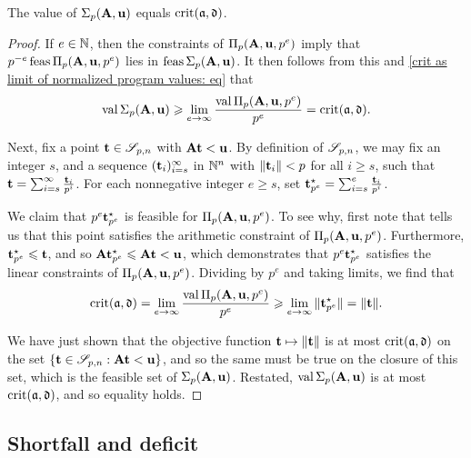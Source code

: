 \documentclass{article}
\begin{document}
\begin{proposition}
   \label{prop: value of fractal program is crit}
   The value of $\Sigma_p(\mathbf{A},\mathbf{u})$ equals $\operatorname{crit}(\mathfrak{a}, \mathfrak{d})$.
\end{proposition}

\begin{proof}
   If $e \in \mathbb{N}$, then the constraints of $\Pi_p(\mathbf{A}, \mathbf{u}, p^e)$ imply that $p^{-e}  \operatorname{feas} \Pi_p(\mathbf{A}, \mathbf{u}, p^e)$ lies in $\operatorname{feas} \Sigma_p(\mathbf{A},\mathbf{u})$.
   It then follows from this and \eqref{crit as limit of normalized program values: eq} that
   \[
      \operatorname{val}\Sigma_p(\mathbf{A},\mathbf{u}) \geqslant \displaystyle \lim_{e \to \infty}\frac{\operatorname{val}\Pi_p(\mathbf{A},\mathbf{u}, p^e)}{p^e} = \operatorname{crit}(\mathfrak{a}, \mathfrak{d}).
   \]

   Next, fix a point $\mathbf{t} \in \mathscr{S}_{p,n}$ with $\mathbf{A} \mathbf{t} < \mathbf{u}$.
   By definition of $\mathscr{S}_{p,n}$, we may fix an integer $s$, and a sequence $( \mathbf{t}_i )_{i=s}^\infty$ in $\mathbb{N}^n$ with $\| \mathbf{t}_i \| < p$ for all $i \geq s$, such that $\mathbf{t} = \sum_{i=s}^{\infty} \frac{\mathbf{t}_i}{p^i}$.
   For each nonnegative integer $e \geq s$, set $\mathbf{t}^\star_{p^e} = \sum_{i=s}^{e} \frac{\mathbf{t}_i}{p^i}$.

   We claim that $p^e  \mathbf{t}^\star_{p^e}$ is feasible for $\Pi_p(\mathbf{A}, \mathbf{u}, p^e)$.
   To see why, first note that  tells us that this point satisfies the arithmetic constraint of $\Pi_p(\mathbf{A}, \mathbf{u}, p^e)$.
   Furthermore, $\mathbf{t}^{\star}_{p^e} \leqslant \mathbf{t}$, and so $\mathbf{A} \mathbf{t}^{\star}_{p^e} \leqslant \mathbf{A} \mathbf{t} < \mathbf{u}$, which demonstrates that $p^e \mathbf{t}^\star_{p^e}$ satisfies the linear constraints of $\Pi_p(\mathbf{A}, \mathbf{u}, p^e)$.
   Dividing by $p^e$ and taking limits, we find that
   \[
      \operatorname{crit}(\mathfrak{a}, \mathfrak{d}) = \lim_{e \to \infty} \frac{\operatorname{val} \Pi_p(\mathbf{A}, \mathbf{u}, p^e)}{p^e} \geqslant \lim_{e \to \infty}   \| \mathbf{t}^\star_{p^e} \| = \| \mathbf{t} \|.
   \]

   We have just shown that the objective function $\mathbf{t} \mapsto \| \mathbf{t} \|$ is at most $\operatorname{crit}(\mathfrak{a}, \mathfrak{d})$ on the set $\{ \mathbf{t} \in \mathscr{S}_{p,n} : \mathbf{A} \mathbf{t} < \mathbf{u} \}$, and so the same must be true on the closure of this set, which is the feasible set of $\Sigma_p(\mathbf{A}, \mathbf{u})$.
   Restated,  $ \operatorname{val} \Sigma_p(\mathbf{A}, \mathbf{u})$ is at most $\operatorname{crit}(\mathfrak{a},  \mathfrak{d})$, and so equality holds.
\end{proof}

\subsection{Shortfall and deficit}
\label{ss: shortfall and deficit}
\end{document}
